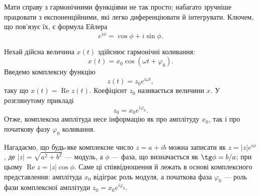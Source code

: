 \begin{Attention}
	Мати справу з гармонічними функціями не так просто; набагато зручніше працювати з експоненційними, які легко диференціювати й інтегрувати. Ключем, що пов'язує їх, є формула Ейлера
	\begin{equation*}
		e^{i\phi} = \cos\phi + i\sin\phi.
	\end{equation*}

	Нехай дійсна величина $x(t)$ здійснює гармонічні коливання:
	\begin{equation}\label{eq:harmonic_real}
		x(t) = x_0 \cos(\omega t + \varphi_0).
	\end{equation}
	Введемо комплексну функцію
	\begin{equation}\label{eq:complex_function}
		z(t) = z_0 e^{i\omega t},
	\end{equation}
	таку що $x(t) = \operatorname{Re} z(t)$. Коефіцієнт $z_0$ називається  величини $x$. У розглянутому прикладі
	\begin{equation}\label{eq:complex_amplitude}
		z_0 = x_0 e^{i\varphi_0}.
	\end{equation}
	Отже, комплексна амплітуда несе інформацію як про амплітуду $x_0$, так і про початкову фазу $\varphi_0$ коливання.

	Нагадаємо, що будь-яке комплексне число $z = a + ib$ можна записати як $z = |z| e^{i\phi}$, де $|z| = \sqrt{a^2 + b^2}$ --- модуль, а $\phi$ --- фаза, що визначається як $\tg\phi = b/a$; при цьому $\operatorname{Re} z = |z|\cos\phi$. Саме ці співвідношення й лежать в основі комплексного представлення: амплітуда $x_0$ відіграє роль модуля, а початкова фаза $\varphi_0$ --- роль фази комплексної амплітуди $z_0 = x_0 e^{i\varphi_0}$.
\end{Attention}


